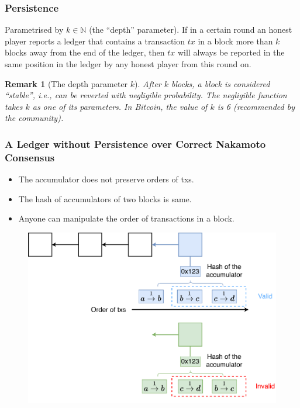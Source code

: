 \documentclass{beamer}
\newtheorem*{remark}{Remark}
\begin{document}
\begin{frame}
\frametitle{Persistence}

\begin{definition}[Persistence]
    Parametrised by $k \in \mathbb{N}$ (the ``depth'' parameter). If in a certain round an honest player reports a ledger that contains a transaction $tx$ in a block more than $k$ blocks away from the end of the ledger, then $tx$ will always be reported in the same position in the ledger by any honest player from this round on.
\end{definition}

\begin{remark}[The depth parameter $k$]
    After $k$ blocks, a block is considered ``stable'', i.e., can be reverted with negligible probability.
    The negligible function takes $k$ as one of its parameters.
    In Bitcoin, the value of $k$ is 6 (recommended by the community).
\end{remark}

\end{frame}


\begin{frame}
\frametitle{A Ledger without Persistence over Correct Nakamoto Consensus}

\begin{itemize}
    \item The accumulator does not preserve orders of txs.
    \item The hash of accumulators of two blocks is same.
    \item Anyone can manipulate the order of transactions in a block.
\end{itemize}

\begin{figure}
    \centering
    \includegraphics[width=.6\textwidth]{no-persistence.pdf}
\end{figure}

\end{frame}
\end{document}
